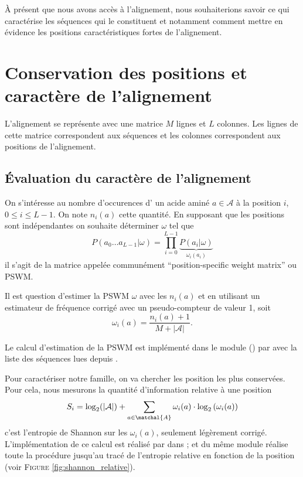 \documentclass[a4paper, french]{article}
\begin{document}
\`A pr\'esent que nous avons acc\`es \`a l'alignement, nous souhaiterions
savoir ce qui caract\'erise les s\'equences qui le constituent et notamment
comment mettre en \'evidence les positions caract\'eristiques fortes de
l'alignement.

\section{Conservation des positions et caract\`ere de l'alignement}

L'alignement se repr\'esente avec une matrice $M$ lignes et $L$ colonnes.
Les lignes de cette matrice correspondent aux s\'equences et les colonnes
correspondent aux positions de l'alignement.

\subsection{\'Evaluation du caract\`ere de l'alignement}
On s'int\'eresse au nombre d'occurences d'%
un acide amin\'e $a\in\mathcal{A}$ \`a la  position $i$, $0\leq i\leq L-1$.
On note $n_i(a)$ cette quantit\'e. En supposant que les positions sont
ind\'ependantes on souhaite d\'eterminer $\omega$ tel que
\begin{equation*}
    P(a_0\ldots a_{L-1}|\omega)=
    \prod_{i=0}^{L-1} \underbrace{P(a_i|\omega)}_{\omega_i(a_i)}
\end{equation*}
il s'agit de la matrice appel\'ee commun\'ement
``position-specific weight matrix'' ou PSWM.

Il est question d'estimer la PSWM $\omega$ avec les $n_i(a)$ et en
utilisant un estimateur de fr\'equence corrig\'e avec un pseudo-compteur
de valeur 1, soit
\begin{equation*}
    \omega_i(a) = \frac{n_i(a) + 1}{M+|\mathcal{A}|}.
    \label{eq:estimateur_pswm}
\end{equation*}

Le calcul d'estimation de la PSWM est impl\'ement\'e dans le module
 () par\break
{} avec  la liste des
s\'equences lues depuis .

Pour caract\'eriser notre famille, on va chercher les position les plus
conserv\'ees. Pour cela, nous mesurons la quantit\'e d'information relative
\`a une position
\begin{equation*}
    S_i = \log_2(|\mathcal{A}|) +
    \sum_{a\in\matchal{A}} \omega_i(a)
    \cdot
    \log_2\left(\omega_i(a)\right)
\end{equation*}
c'est l'entropie de Shannon sur les $\omega_i(a)$,
seulement l\'eg\`erement corrig\'e.
L'impl\'ementation de ce calcul est r\'ealis\'e par
 dans
; et  du m\^eme module r\'ealise toute la
proc\'edure jusqu'au trac\'e de l'entropie relative en fonction de la
position (voir F\textsc{igure} \ref{fig:shannon_relative}).
\end{document}
